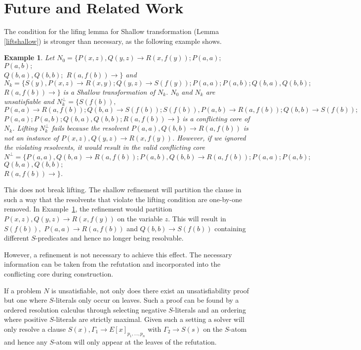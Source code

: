 \documentclass{llncs}
\newcommand{\imp}{\rightarrow}
\newtheorem{exmp}{Example}
\begin{document}
\section{Future and Related Work} \label{sec:furewo}


The condition for the lifing lemma for Shallow transformation (Lemma \ref{liftshallow})  is stronger than necessary, as the following example shows.  

\begin{exmp}\label{shallowex2}
Let $N_0 = \{ P(x,z), Q(y,z) \imp R(x,f(y)); P(a,a);$ $ P(a,b); $ \\ $ Q(b,a), Q(b,b);$ $ R(a,f(b)) \imp\}$  and
 $N_k = \{ S(y),P(x,z) \imp R(x,y); Q(y,z) \imp S(f(y)); P(a,a); P(a,b); Q(b,a) , Q(b,b);$ $  R(a,f(b))  \imp\}$ is a Shallow transformation of $N_k$. 
$N_0$ and $N_k$ are unsatisfiable and $N^\bot_k=\{ S(f(b)),$ $P(a,a) \imp R(a,f(b)); Q(b,a) \imp S(f(b)); S(f(b)),P(a,b) \imp R(a,f(b)); Q(b,b) \imp S(f(b));$ $ P(a,a);  P(a,b);  Q(b,a), Q(b,b);  R(a,f(b))\imp\}$
is a conflicting core of $N_k$. Lifting $N^\bot_k$ fails because the resolvent $P(a,a), Q(b,b) \imp R(a,f(b))$ is not an instance of  $P(x,z), Q(y,z) \imp R(x,f(y))$.
However, if we ignored the violating resolvents, it would result in the valid conflicting core $N^\bot=\{ P(a,a),Q(b,a) \imp R(a,f(b)); P(a,b),Q(b,b) \imp R(a,f(b)); P(a,a);  P(a,b);$ $ Q(b,a), Q(b,b);$\\ $ R(a,f(b)) \imp\}$.
\end{exmp} 

This does not break lifting. 
The shallow refinement will partition the clause in such a way that the resolvents that violate the lifting condition are one-by-one removed.
In Example~\ref{shallowex2}, the refinement would partition  $P(x,z), Q(y,z) \imp R(x,f(y))$ on the variable $z$.
This will result in $S(f(b)),$ $P(a,a) \imp R(a,f(b))$ and  $Q(b,b) \imp S(f(b))$ containing different $S$-predicates and hence no longer being resolvable. 

However, a refinement is not necessary to achieve this effect. 
The necessary information can be taken from the refutation 
and incorporated into the conflicting core during construction.

If a problem $N$ is unsatisfiable, not only does there exist an unsatisfiability proof but one where $S$-literals only occur on leaves.
Such a proof can be found by a ordered resolution calculus through selecting negative $S$-literals and an ordering where positive $S$-literals are strictly maximal.
Given such a setting a solver will only resolve a clause  
$S(x),\Gamma_1 \imp E[x]_{p_1,\dots,p_n}$ with $\Gamma_2 \imp S(s)$ on the $S$-atom 
and hence any $S$-atom will only appear at the leaves of the refutation.
\end{document}
